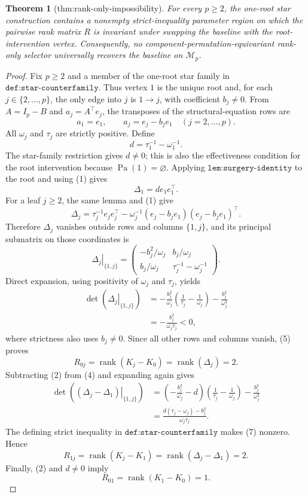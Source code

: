 \documentclass{article}
\newtheorem{theorem}{Theorem}
\begin{document}
\begin{theorem}[thm:rank-only-impossibility]\label{thm:rank-only-impossibility}
For every \(p\ge2\), the one-root star construction contains a nonempty strict-inequality parameter region on which the pairwise rank matrix \(R\) is invariant under swapping the baseline with the root-intervention vertex. Consequently, no component-permutation-equivariant rank-only selector universally recovers the baseline on \(\mathcal M_p\).
\end{theorem}
\begin{proof}
Fix \(p\geq 2\) and a member of the one-root star family in \(\texttt{def:star-counterfamily}\).  Thus vertex \(1\) is the unique root and, for each \(j\in\{2,\ldots,p\}\), the only edge into \(j\) is \(1\to j\), with coefficient \(b_j\neq0\).  From \(A=I_p-B\) and \(a_j=A^{\top}e_j\), the transposes of the structural-equation rows are
\[
 a_1=e_1,
 \qquad
 a_j=e_j-b_je_1\quad (j=2,\ldots,p).
 \tag{1}
\]
All \(\omega_j\) and \(\tau_j\) are strictly positive.  Define
\[
 d=\tau_1^{-1}-\omega_1^{-1}.
\]
The star-family restriction gives \(d\neq0\); this is also the effectiveness condition for the root intervention because \(\operatorname{Pa}(1)=\varnothing\).  Applying \(\texttt{lem:surgery-identity}\) to the root and using (1) gives
\[
 \Delta_1=d e_1e_1^{\top}.
 \tag{2}
\]
For a leaf \(j\geq2\), the same lemma and (1) give
\[
 \Delta_j
 =\tau_j^{-1}e_je_j^{\top}
  -\omega_j^{-1}(e_j-b_je_1)(e_j-b_je_1)^{\top}.
 \tag{3}
\]
Therefore \(\Delta_j\) vanishes outside rows and columns \(\{1,j\}\), and its principal submatrix on those coordinates is
\[
 \left.\Delta_j\right|_{\{1,j\}}
 =
 \begin{pmatrix}
 -b_j^2/\omega_j & b_j/\omega_j\\
 b_j/\omega_j & \tau_j^{-1}-\omega_j^{-1}
 \end{pmatrix}.
 \tag{4}
\]
Direct expansion, using positivity of \(\omega_j\) and \(\tau_j\), yields
\[
 \begin{aligned}
 \det\!\left(\left.\Delta_j\right|_{\{1,j\}}\right)
 &= -\frac{b_j^2}{\omega_j}
       \left(\frac1{\tau_j}-\frac1{\omega_j}\right)
    -\frac{b_j^2}{\omega_j^2}\\
 &= -\frac{b_j^2}{\omega_j\tau_j}<0,
 \end{aligned}
 \tag{5}
\]
where strictness also uses \(b_j\neq0\).  Since all other rows and columns vanish, (5) proves
\[
 R_{0j}=\operatorname{rank}(K_j-K_0)
 =\operatorname{rank}(\Delta_j)=2.
 \tag{6}
\]
Subtracting (2) from (4) and expanding again gives
\[
 \begin{aligned}
 \det\!\left(
   \left.(\Delta_j-\Delta_1)\right|_{\{1,j\}}
 \right)
 &=\left(-\frac{b_j^2}{\omega_j}-d\right)
      \left(\frac1{\tau_j}-\frac1{\omega_j}\right)
      -\frac{b_j^2}{\omega_j^2}\\
 &=\frac{d(\tau_j-\omega_j)-b_j^2}{\omega_j\tau_j}.
 \end{aligned}
 \tag{7}
\]
The defining strict inequality in \(\texttt{def:star-counterfamily}\) makes (7) nonzero.  Hence
\[
 R_{1j}=\operatorname{rank}(K_j-K_1)
 =\operatorname{rank}(\Delta_j-\Delta_1)=2.
 \tag{8}
\]
Finally, (2) and \(d\neq0\) imply
\[
 R_{01}=\operatorname{rank}(K_1-K_0)=1.
 \tag{9}
\]


\end{proof}
\end{document}
